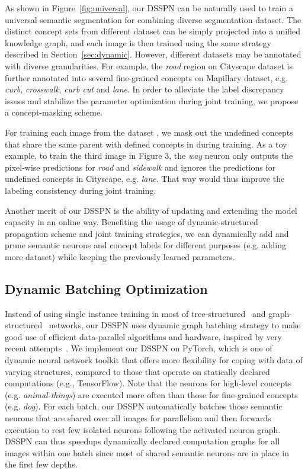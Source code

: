 \documentclass[10pt,twocolumn,letterpaper]{article}
\begin{document}
As shown in Figure~\ref{fig:universal}, our DSSPN can be naturally used to train a universal semantic segmentation for combining diverse segmentation dataset. The distinct concept sets from different dataset can be simply projected into a unified knowledge graph, and each image is then trained using the same strategy described in Section~\ref{sec:dynamic}. However, different datasets may be annotated with diverse granularities. For example,  the \emph{road} region on Cityscape dataset is further annotated into several fine-grained concepts on Mapillary dataset, e.g. \emph{curb}, \emph{crosswalk}, \emph{curb cut} and \emph{lane}. In order to alleviate the label discrepancy issues and stabilize the parameter optimization during joint training, we propose a concept-masking scheme. 

For training each image from the dataset , we mask out the undefined concepts that share the same parent with defined concepts in  during training. As a toy example, to train the third image in Figure 3, the \emph{way} neuron only outputs the pixel-wise predictions for \emph{road} and \emph{sidewalk} and ignores the predictions for undefined concepts in Cityscape, e.g. \emph{lane}. That way would thus improve the labeling consistency during joint training. 

Another merit of our DSSPN is the ability of updating and extending the model capacity in an online way. Benefiting the usage of dynamic-structured propagation scheme and joint training strategies, we can dynamically add and prune semantic neurons and concept labels for different purposes (e.g. adding more dataset) while keeping the previously learned parameters.

	
\subsection{Dynamic Batching Optimization}

Instead of using single instance training in most of tree-structured~\cite{socher2011parsing} and graph-structured~\cite{liang2016semantic,liang2017deep} networks, our DSSPN uses dynamic graph batching strategy to make good use of efficient data-parallel algorithms and hardware, inspired by very recent attempts~\cite{looks2017deep,bowman2016fast,neubig2017fly}.  We implement our DSSPN on PyTorch, which is one of dynamic neural network toolkit that offers more flexibility for coping with data of varying structures, compared to those that operate on statically declared computations (e.g.,
TensorFlow). Note that the neurons for high-level concepts (e.g. \emph{animal-things}) are executed more often than those for fine-grained concepts (e.g. \emph{dog}). For each batch, our DSSPN automatically batches those semantic neurons that are shared over all images for parallelism and then forwards execution to rest few isolated neurons following the activated neuron graph. DSSPN can thus speedups dynamically declared computation graphs for all images within one batch since most of shared semantic neurons are in place in the first few depths.  
\end{document}
